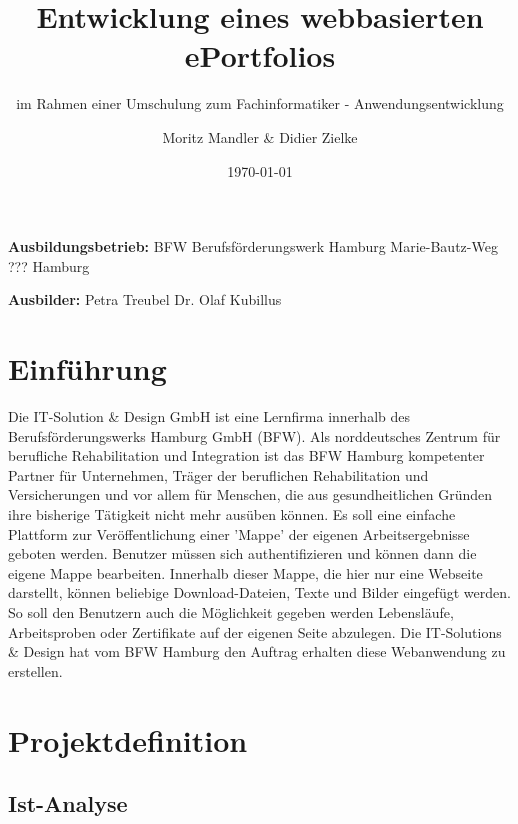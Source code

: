 \documentclass[10pt]{scrarticle}
\title{Entwicklung eines webbasierten ePortfolios}
\subtitle{im Rahmen einer Umschulung zum Fachinformatiker - Anwendungsentwicklung}
\author{Moritz Mandler \& Didier Zielke}
\date{\today}
\begin{document}
\maketitle


\vspace{\fill}
\textbf{Ausbildungsbetrieb:}\newline
BFW Berufsförderungswerk Hamburg \newline
Marie-Bautz-Weg ???  Hamburg

\textbf{Ausbilder:}\newline
Petra Treubel \newline
Dr. Olaf Kubillus

\newpage

\tableofcontents

\newpage

\section{Einführung}

Die IT-Solution \& Design GmbH ist eine Lernfirma innerhalb des Berufsförderungswerks Hamburg GmbH (BFW). Als norddeutsches Zentrum für berufliche Rehabilitation und Integration ist das BFW Hamburg kompetenter Partner für Unternehmen, Träger der beruflichen Rehabilitation und Versicherungen und vor allem für Menschen, die aus gesundheitlichen Gründen ihre bisherige Tätigkeit nicht mehr ausüben können.  
Es soll eine einfache Plattform zur Veröffentlichung einer 'Mappe' der eigenen Arbeitsergebnisse geboten werden. Benutzer müssen sich authentifizieren und können dann die eigene Mappe bearbeiten. Innerhalb dieser Mappe, die hier nur eine Webseite darstellt, können beliebige Download-Dateien, Texte und Bilder eingefügt werden. So soll den Benutzern auch die Möglichkeit gegeben werden Lebensläufe, Arbeitsproben oder Zertifikate auf der eigenen Seite abzulegen.
Die IT-Solutions \& Design hat vom BFW Hamburg den Auftrag erhalten diese Webanwendung zu erstellen. 

\section{Projektdefinition}
\subsection{Ist-Analyse}
\end{document}
